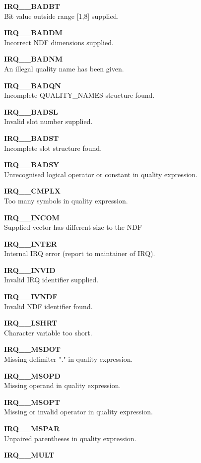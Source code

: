 \begin{description}
\item {\bf IRQ\_\_BADBT}\\
Bit value outside range [1,8] supplied.
\item {\bf IRQ\_\_BADDM}\\
Incorrect NDF dimensions supplied.
\item {\bf IRQ\_\_BADNM}\\
An illegal quality name has been given.
\item {\bf IRQ\_\_BADQN}\\
Incomplete QUALITY\_NAMES structure found.
\item {\bf IRQ\_\_BADSL}\\
Invalid slot number supplied.
\item {\bf IRQ\_\_BADST}\\
Incomplete slot structure found.
\item {\bf IRQ\_\_BADSY}\\
Unrecognised logical operator or constant in quality expression.
\item {\bf IRQ\_\_CMPLX}\\
Too many symbols in quality expression.
\item {\bf IRQ\_\_INCOM}\\
Supplied vector has different size to the NDF
\item {\bf IRQ\_\_INTER}\\
Internal IRQ error (report to maintainer of IRQ).
\item {\bf IRQ\_\_INVID}\\
Invalid IRQ identifier supplied.
\item {\bf IRQ\_\_IVNDF}\\
Invalid NDF identifier found.
\item {\bf IRQ\_\_LSHRT}\\
Character variable too short.
\item {\bf IRQ\_\_MSDOT}\\
Missing delimiter "." in quality expression.
\item {\bf IRQ\_\_MSOPD}\\
Missing operand in quality expression.
\item {\bf IRQ\_\_MSOPT}\\
Missing or invalid operator in quality expression.
\item {\bf IRQ\_\_MSPAR}\\
Unpaired parentheses in quality expression.
\item {\bf IRQ\_\_MULT }\\

\end{description}
